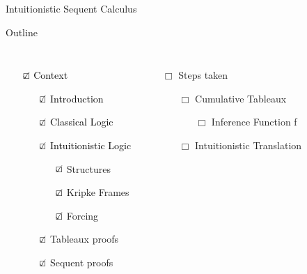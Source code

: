 \documentclass{beamer}
\begin{document}
\begin{frame}{Intuitionistic Sequent Calculus}
    \tiny{
    \RulesIntuitionisticSequentCalculusSmallBF
    }
\end{frame}



\begin{frame}{Outline}
    \begin{columns}
        \begin{itemize}
            \item[$\textcolor{black}{\CheckedBox}$] \textcolor{black}{Context}
            \begin{itemize}
                \item[$\textcolor{black}{\CheckedBox}$] \textcolor{black}{Introduction}
                \item[$\textcolor{black}{\CheckedBox}$] \textcolor{black}{Classical Logic}
                \item[$\textcolor{black}{\CheckedBox}$] \textcolor{black}{Intuitionistic Logic}
                \begin{itemize}
                    \item[$\textcolor{black}\CheckedBox$] Structures
                    \item[$\textcolor{black}\CheckedBox$] Kripke Frames
                    \item[$\textcolor{black}\CheckedBox$] Forcing
                \end{itemize}
                \item[$\textcolor{black}\CheckedBox$] Tableaux proofs
                \item[$\textcolor{black}\CheckedBox$] Sequent proofs
            \end{itemize}
        \end{itemize}
        \begin{itemize}
            \item[${\Box}$] {Steps taken}
            \begin{itemize}
                \item[${\Box}$] {Cumulative Tableaux}
                \begin{itemize}
                    \item[${\Box}$] {Inference Function f}
                \end{itemize}
                \item[${\Box}$] {Intuitionistic Translation}

\end{itemize}
\end{itemize}
\end{columns}
\end{frame}
\end{document}
